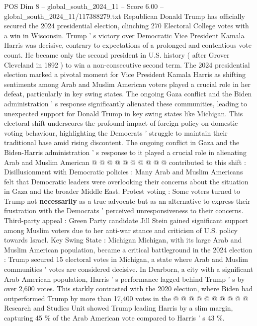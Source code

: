 \begin{textsample}{POS Dim 8 – global\_south\_2024\_11 – Score 6.00 – global\_south\_2024\_11/117388279.txt}  \label{ex:f8_pos_151}
Republican Donald Trump has officially secured the 2024 presidential election, clinching 270 Electoral College votes with a win in Wisconsin.
Trump ' s victory over Democratic Vice President Kamala Harris was decisive, contrary to expectations of a prolonged and contentious vote count.
He became only the second president in U.S. history ( after Grover Cleveland in 1892 ) to win a non-consecutive second term.
The 2024 presidential election marked a pivotal moment for Vice President Kamala Harris as shifting sentiments among Arab and Muslim American voters played a crucial role in her defeat, particularly in key swing states.
The ongoing Gaza conflict and the Biden administration ' s response significantly alienated these communities, leading to unexpected support for Donald Trump in key swing states like Michigan.
This electoral shift underscores the profound impact of foreign policy on domestic voting behaviour, highlighting the Democrats ' struggle to maintain their traditional base amid rising discontent.
The ongoing conflict in Gaza and the Biden-Harris administration ' s response to it played a crucial role in alienating Arab and Muslim American @ @ @ @ @ @ @ @ @ @ contributed to this shift : Disillusionment with Democratic policies : Many Arab and Muslim Americans felt that Democratic leaders were overlooking their concerns about the situation in Gaza and the broader Middle East.
Protest voting : Some voters turned to Trump not \textbf{necessarily} as a true advocate but as an alternative to express their frustration with the Democrats ' perceived unresponsiveness to their concerns.
Third-party appeal : Green Party candidate Jill Stein gained significant support among Muslim voters due to her anti-war stance and criticism of U.S. policy towards Israel.
Key Swing State : Michigan Michigan, with its large Arab and Muslim American population, became a critical battleground in the 2024 election : Trump secured 15 electoral votes in Michigan, a state where Arab and Muslim communities ' votes are considered decisive.
In Dearborn, a city with a significant Arab American population, Harris ' s performance lagged behind Trump ' s by over 2,600 votes.
This starkly contrasted with the 2020 election, where Biden had outperformed Trump by more than 17,400 votes in the @ @ @ @ @ @ @ @ @ @ Research and Studies Unit showed Trump leading Harris by a slim margin, capturing 45 \% of the Arab American vote compared to Harris ' s 43 \%.

\end{textsample}
